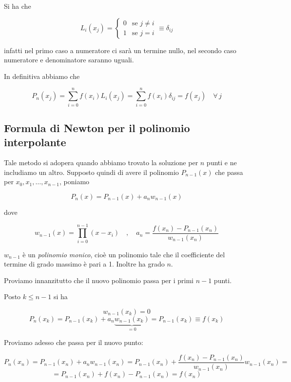 Si ha che

$$L_i(x_j)=
\left\{
   \begin{array}{ll}
      0 & \text{se } j \neq i\\
      1 & \text{se } j = i
   \end{array}
\right.
\equiv \delta_{ij}$$

infatti nel primo caso a numeratore ci sarà un termine nullo, nel secondo caso numeratore e denominatore saranno uguali.

In definitiva abbiamo che

$$P_n(x_j)=\sum_{i=0}^{n} f(x_i) L_i(x_j)
=\sum_{i=0}^{n} f(x_i) \delta_{ij}
=f(x_j) \quad \forall \, j$$

\subsection{Formula di Newton per il polinomio interpolante}

Tale metodo si adopera quando abbiamo trovato la soluzione per $n$ punti e ne includiamo un altro. Supposto quindi di avere il polinomio $P_{n-1}(x)$ che passa per $x_0,x_1,\ldots,x_{n-1}$, poniamo

$$P_n(x)=P_{n-1}(x) + a_n w_{n-1}(x)$$

dove

$$w_{n-1}(x)=\prod_{i=0}^{n-1} (x - x_i)
\quad,\quad
a_n=\frac{f(x_n) - P_{n-1}(x_n)}{w_{n-1}(x_n)}$$

$w_{n-1}$ è un \textit{polinomio monico}, cioè un polinomio tale che il coefficiente del termine di grado massimo è pari a 1. Inoltre ha grado $n$.

\vspace{0.2cm}Proviamo innanzitutto che il nuovo polinomio passa per i primi $n-1$ punti.

Posto $k \leq n-1$ si ha

$$w_{n-1}(x_k)=0$$
$$P_n(x_k)=P_{n-1}(x_k) + a_n \underbrace{w_{n-1}(x_k)}_{=0}
=P_{n-1}(x_k)
\equiv f(x_k)$$

Proviamo adesso che passa per il nuovo punto:

$$P_n(x_n)=P_{n-1}(x_n) + a_n w_{n-1}(x_n)
=P_{n-1}(x_n) + \frac{f(x_n) - P_{n-1}(x_n)}{w_{n-1}(x_n)} w_{n-1}(x_n)=$$
$$=P_{n-1}(x_n) + f(x_n) - P_{n-1}(x_n)
=f(x_n) $$